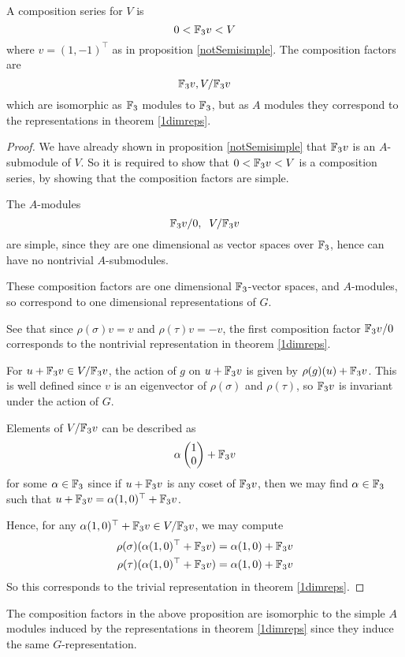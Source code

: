 \documentclass{unswmaths}
\begin{document}
\begin{proposition}
    A composition series for $V$ is 
    \begin{equation*}
        0 < {\mathbb{F}_3} v < V
    \end{equation*} 
    where $v = (1,-1)^\top$ as in proposition \ref{notSemisimple}. The composition
    factors are 
    \begin{equation*}
        {\mathbb{F}_3} v, V/{\mathbb{F}_3} v
    \end{equation*}
    which are isomorphic as ${\mathbb{F}_3}$ modules to ${\mathbb{F}_3}$, but as $A$ modules
    they correspond to the representations in theorem \ref{1dimreps}.
\end{proposition}
\begin{proof}
    We have already shown in proposition \ref{notSemisimple} that ${\mathbb{F}_3} v$ is an
    $A$-submodule of $V$. So it is required to show that $0 < {\mathbb{F}_3} v < V$ is a composition
    series, by showing that the composition factors are simple.
    
    The $A$-modules
    \begin{equation*}
        {\mathbb{F}_3} v/0,\;\; V/{\mathbb{F}_3} v
    \end{equation*}
    are simple, since they are one dimensional as vector spaces over ${\mathbb{F}_3}$, hence
    can have no nontrivial $A$-submodules. 
    
    These composition factors are one dimensional ${\mathbb{F}_3}$-vector spaces,
    and $A$-modules, so correspond to one dimensional representations of $G$. 
   
    See that since $\rho(\sigma)v = v$ and $\rho(\tau)v = -v$, the first composition factor
    ${\mathbb{F}_3} v/0$ corresponds to the nontrivial representation in theorem \ref{1dimreps}.
    
    For $u+{\mathbb{F}_3} v \in V/{\mathbb{F}_3} v$, the action of $g$ on $u+{\mathbb{F}_3} v$ is given by
    $\rho(g)(u)+{\mathbb{F}_3} v$. This is well defined since $v$ is an eigenvector
    of $\rho(\sigma)$ and $\rho(\tau)$, so ${\mathbb{F}_3} v$ is invariant under the action of $G$.

    Elements of $V/{\mathbb{F}_3} v$ can be described as
    \begin{equation*}
        \alpha \begin{pmatrix}
            1\\0
        \end{pmatrix}
        +{\mathbb{F}_3} v
    \end{equation*} 
    for some $\alpha \in {\mathbb{F}_3}$
    since if $u+{\mathbb{F}_3} v$ is any coset of ${\mathbb{F}_3} v$, then we may find $\alpha \in {\mathbb{F}_3}$
    such that $u+{\mathbb{F}_3} v = \alpha(1,0)^\top +{\mathbb{F}_3} v$.
    
    Hence, for any $\alpha(1,0)^\top+{\mathbb{F}_3} v \in V/{\mathbb{F}_3} v$, we may compute
    \begin{align*}
        \rho(\sigma)(\alpha(1,0)^\top+{\mathbb{F}_3} v) &= \alpha (1,0)+{\mathbb{F}_3} v\\
        \rho(\tau)(\alpha(1,0)^\top +{\mathbb{F}_3} v) &= \alpha(1,0)+{\mathbb{F}_3} v
    \end{align*}
    So this corresponds to the trivial representation in theorem \ref{1dimreps}.  
    
\end{proof}
\begin{remark}
    The composition factors in the above proposition are isomorphic to the simple $A$ modules
    induced by the representations in theorem \ref{1dimreps} since they induce the same $G$-representation.
\end{remark}    
    
\end{document}
